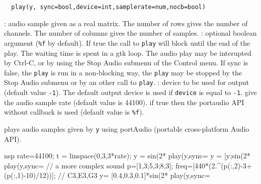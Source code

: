 
\begin{mandesc}
\end{mandesc}
\begin{calling_sequence}
\begin{verbatim}
  play(y, sync=bool,device=int,samplerate=num,nocb=bool)  
\end{verbatim}
\end{calling_sequence}
\begin{parameters}
  \begin{varlist}
    : audio sample given as a real matrix. The number of 
    rows gives the number of channels. The number of columns gives 
    the number of samples.
    : optional boolean argument (\verb+%f+ by default). If true the call to \verb+play+ 
    will block until the end of the play. The waiting time is spent
    in a gtk loop. The audio play may be interupted by 
    Ctrl-C, or by using the Stop Audio submenu of the Control menu. 
    If sync is false, the \verb+play+ is run in a non-blocking way, the 
    \verb+play+ may be stopped by the  Stop Audio submenu or by an other call 
    to \verb+play+. 
   : device to be used for output (default value \verb+-1+). The default output 
   device is used if \verb+device+ is equal to \verb+-1+.
    give the audio sample rate (default value is 44100).
    if true then the portaudio API without callback is used 
   (default value is \verb+%f+).
  \end{varlist}
\end{parameters}

\begin{mandescription}
  plays audio samples given by \verb+y+ using portAudio (portable cross-platform Audio API).
\end{mandescription}
\begin{examples}
  \begin{mintednsp}{nsp}
    rate=44100;
    t = linspace(0,3,3*rate);
    y = sin(2*%
    play(y,sync=%
    y = [y;sin(2*%
    play(y,sync=%
    // a more complex sound 
    p=[1,3;5,3;8,3]; 
    freq=[440*(2.^(p(:,2)-3+(p(:,1)-10)/12))]; // C3,E3,G3
    y= [0.4,0.3,0.1]*sin(2*%
    play(y,sync=%
  \end{mintednsp}
\end{examples}
\begin{manseealso}
\end{manseealso}


